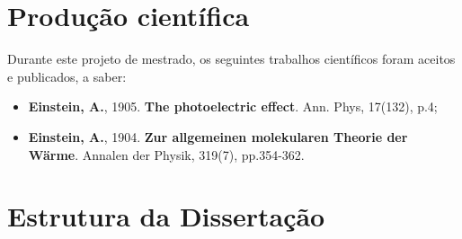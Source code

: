 \section{Produção científica}\label{sec:producao}
Durante este projeto de mestrado, os seguintes trabalhos científicos foram aceitos e publicados, a saber:

\begin{itemize}
	\item \textbf{Einstein, A.}, 1905. \textbf{The photoelectric effect}. Ann. Phys, 17(132), p.4;
	\item \textbf{Einstein, A.}, 1904. \textbf{Zur allgemeinen molekularen Theorie der Wärme}. Annalen der Physik, 319(7), pp.354-362.
\end{itemize}

\section{Estrutura da Dissertação}\label{sec:estrutura}
\lipsum[1]
